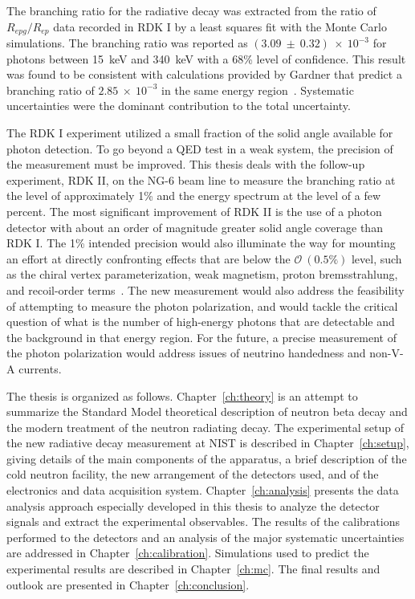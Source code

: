 \documentclass[oneside,12pt]{memoir}
\begin{document}
The branching ratio for the radiative decay was extracted from the ratio of $R_{epg}/R_{ep}$ data recorded in RDK I by a least squares fit with the Monte Carlo simulations. The branching ratio was reported as $(3.09~\pm~0.32)~\times~10^{-3}$ for photons between 15~keV and 340~keV with a 68\% level of confidence. This result was found to be consistent with calculations provided by Gardner that predict a branching ratio of $2.85~\times~10^{-3}$ in the same energy region~\cite{rdk1prc}. Systematic uncertainties were the dominant contribution to the total uncertainty.\par
The RDK I experiment utilized a small fraction of the solid angle available for photon detection. To go beyond a QED test in a weak system, the precision of the measurement must be improved. This thesis deals with the follow-up experiment, RDK II, on the NG-6 beam line to measure the branching ratio at the level of approximately 1\% and the energy spectrum at the level of a few percent. The most significant improvement of RDK II is the use of a photon detector with about an order of magnitude greater solid angle coverage than RDK I. The 1\% intended precision would also illuminate the way for mounting an effort at directly confronting effects that are below the $\mathcal{O}~(0.5\%)$ level, such as the chiral vertex parameterization, weak magnetism, proton bremsstrahlung, and recoil-order terms~\cite{Bernard04,Bernard04er}. The new measurement would also address the feasibility of attempting to measure the photon polarization, and would tackle the critical question of what is the number of high-energy photons that are detectable and the background in that energy region. For the future, a precise measurement of the photon polarization would address issues of neutrino handedness and non-V-A currents.\par
The thesis is organized as follows. Chapter~\ref{ch:theory} is an attempt to summarize the Standard Model theoretical description of neutron beta decay and the modern treatment of the neutron radiating decay. The experimental setup of the new radiative decay measurement at NIST is described in Chapter~\ref{ch:setup}, giving details of the main components of the apparatus, a brief description of the cold neutron facility, the new arrangement of the detectors used, and of the electronics and data acquisition system. Chapter~\ref{ch:analysis} presents the data analysis approach especially developed in this thesis to analyze the detector signals and extract the experimental observables. The results of the calibrations performed to the detectors and an analysis of the major systematic uncertainties are addressed in Chapter~\ref{ch:calibration}. Simulations used to predict the experimental results are described in Chapter~\ref{ch:mc}. The final results and outlook are presented in Chapter~\ref{ch:conclusion}.
\end{document}
